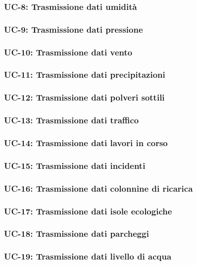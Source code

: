 \subsubsection{UC-8: Trasmissione dati umidità}

\subsubsection{UC-9: Trasmissione dati pressione}

\subsubsection{UC-10: Trasmissione dati vento}

\subsubsection{UC-11: Trasmissione dati precipitazioni}

\subsubsection{UC-12: Trasmissione dati polveri sottili}

\subsubsection{UC-13: Trasmissione dati traffico}

\subsubsection{UC-14: Trasmissione dati lavori in corso}

\subsubsection{UC-15: Trasmissione dati incidenti}

\subsubsection{UC-16: Trasmissione dati colonnine di ricarica}

\subsubsection{UC-17: Trasmissione dati isole ecologiche}

\subsubsection{UC-18: Trasmissione dati parcheggi}

\subsubsection{UC-19: Trasmissione dati livello di acqua}


















